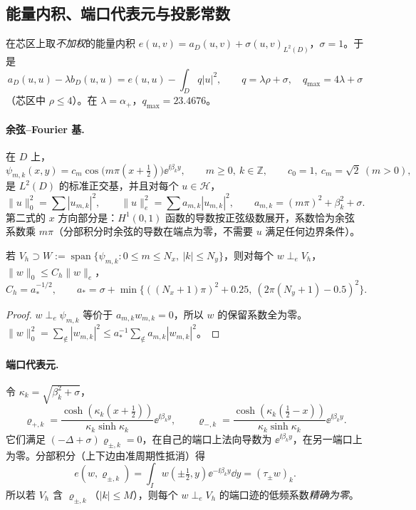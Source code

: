 \documentclass[11pt,a4paper,fontset=fandol]{ctexart}
\begin{document}
\subsection{能量内积、端口代表元与投影常数}

在芯区上取\emph{不加权}的能量内积 $e(u,v)=a_D(u,v)+\sigma(u,v)_{L^2(D)}$，$\sigma=1$。于是
\[
a_D(u,u)-\lambda b_D(u,u)=e(u,u)-\int_Dq|u|^2,\qquad q=\lambda\rho+\sigma,\quad q_{\max}=4\lambda+\sigma
\]
（芯区中 $\rho\le4$）。在 $\lambda=\alpha_+$，$q_{\max}=23.4676$。

\paragraph{余弦--Fourier 基.} 在 $D$ 上，
\[
\psi_{m,k}(x,y)=c_m\cos\bigl(m\pi(x+\tfrac12)\bigr)\ee^{\ii\beta_ky},\qquad m\ge0,\ k\in\mathbb Z,\qquad c_0=1,\ c_m=\sqrt2\ (m>0),
\]
是 $L^2(D)$ 的标准正交基，并且对每个 $u\in\mathcal H$，
\begin{equation}
\label{eq:cos-parseval}
\|u\|_0^2=\sum|u_{m,k}|^2,\qquad \|u\|_e^2=\sum a_{m,k}|u_{m,k}|^2,\qquad a_{m,k}=(m\pi)^2+\beta_k^2+\sigma .
\end{equation}
第二式的 $x$ 方向部分是：$H^1(0,1)$ 函数的导数按正弦级数展开，系数恰为余弦系数乘 $m\pi$（分部积分时余弦的导数在端点为零，不需要 $u$ 满足任何边界条件）。

\begin{lemma}[投影常数]
\label{lem:proj-const}
若 $V_h\supset W:=\operatorname{span}\{\psi_{m,k}:0\le m\le N_x,\ |k|\le N_y\}$，则对每个 $w\perp_eV_h$，$\|w\|_0\le C_h\|w\|_e$，
\[
C_h=a_*^{-1/2},\qquad a_*=\sigma+\min\bigl\{((N_x+1)\pi)^2+0.25,\ (2\pi(N_y+1)-0.5)^2\bigr\}.
\]
\end{lemma}

\begin{proof}
$w\perp_e\psi_{m,k}$ 等价于 $a_{m,k}w_{m,k}=0$，所以 $w$ 的保留系数全为零。$\|w\|_0^2=\sum_{\notin}|w_{m,k}|^2\le a_*^{-1}\sum_{\notin}a_{m,k}|w_{m,k}|^2$。
\end{proof}

\paragraph{端口代表元.} 令 $\kappa_k=\sqrt{\beta_k^2+\sigma}$，
\[
\varrho_{+,k}=\frac{\cosh(\kappa_k(x+\frac12))}{\kappa_k\sinh\kappa_k}\ee^{\ii\beta_ky},\qquad
\varrho_{-,k}=\frac{\cosh(\kappa_k(\frac12-x))}{\kappa_k\sinh\kappa_k}\ee^{\ii\beta_ky}.
\]
它们满足 $(-\Delta+\sigma)\varrho_{\pm,k}=0$，在自己的端口上法向导数为 $\ee^{\ii\beta_ky}$，在另一端口上为零。分部积分（上下边由准周期性抵消）得
\begin{equation}
\label{eq:port-rep}
e(w,\varrho_{\pm,k})=\int_I w(\pm\tfrac12,y)\ee^{-\ii\beta_ky}\dd y=(\tau_\pm w)_k .
\end{equation}
所以若 $V_h$ 含 $\varrho_{\pm,k}$（$|k|\le M$），则每个 $w\perp_eV_h$ 的端口迹的低频系数\emph{精确为零}。
\end{document}
